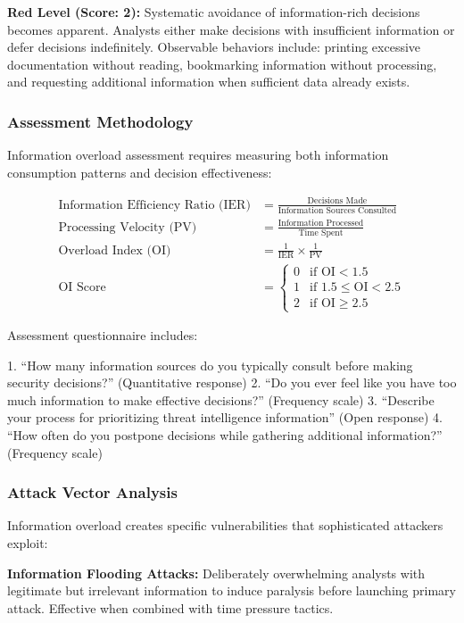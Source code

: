 \documentclass[11pt,a4paper]{article}
\begin{document}
\textbf{Red Level (Score: 2):} Systematic avoidance of information-rich decisions becomes apparent. Analysts either make decisions with insufficient information or defer decisions indefinitely. Observable behaviors include: printing excessive documentation without reading, bookmarking information without processing, and requesting additional information when sufficient data already exists.

\subsubsection{Assessment Methodology}

Information overload assessment requires measuring both information consumption patterns and decision effectiveness:

\begin{align}
\text{Information Efficiency Ratio (IER)} &= \frac{\text{Decisions Made}}{\text{Information Sources Consulted}} \\
\text{Processing Velocity (PV)} &= \frac{\text{Information Processed}}{\text{Time Spent}} \\
\text{Overload Index (OI)} &= \frac{1}{\text{IER}} \times \frac{1}{\text{PV}} \\
\text{OI Score} &= \begin{cases}
0 & \text{if OI} < 1.5 \\
1 & \text{if } 1.5 \leq \text{OI} < 2.5 \\
2 & \text{if OI} \geq 2.5
\end{cases}
\end{align}

Assessment questionnaire includes:

1. ``How many information sources do you typically consult before making security decisions?'' (Quantitative response)
2. ``Do you ever feel like you have too much information to make effective decisions?'' (Frequency scale)
3. ``Describe your process for prioritizing threat intelligence information'' (Open response)
4. ``How often do you postpone decisions while gathering additional information?'' (Frequency scale)

\subsubsection{Attack Vector Analysis}

Information overload creates specific vulnerabilities that sophisticated attackers exploit:

\textbf{Information Flooding Attacks:} Deliberately overwhelming analysts with legitimate but irrelevant information to induce paralysis before launching primary attack. Effective when combined with time pressure tactics.
\end{document}
